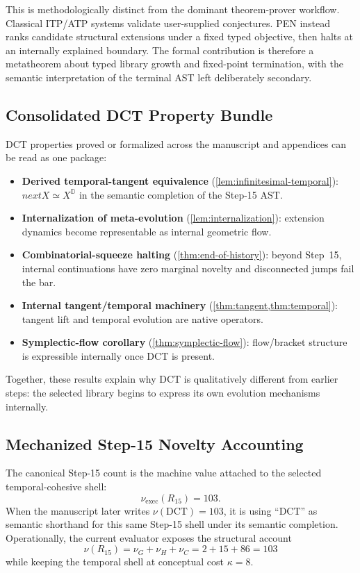 \documentclass[11pt,a4paper]{article}
\def\bigcirc{next}%
\theoremstyle{plain}
\theoremstyle{definition}
\theoremstyle{remark}
\newcommand{\D}{\mathbb{D}}
\begin{document}
This is methodologically distinct from the dominant theorem-prover workflow.
Classical ITP/ATP systems validate user-supplied conjectures.
PEN instead ranks candidate structural extensions under a fixed typed objective, then halts at an internally explained boundary.
The formal contribution is therefore a metatheorem about typed library growth and fixed-point termination, with the semantic interpretation of the terminal AST left deliberately secondary.

\subsection{Consolidated DCT Property Bundle}

DCT properties proved or formalized across the manuscript and appendices can be read as one package:
\begin{itemize}[nosep]
    \item \textbf{Derived temporal-tangent equivalence} (\cref{lem:infinitesimal-temporal}): $\bigcirc X \simeq X^\D$ in the semantic completion of the Step-15 AST.
    \item \textbf{Internalization of meta-evolution} (\cref{lem:internalization}): extension dynamics become representable as internal geometric flow.
    \item \textbf{Combinatorial-squeeze halting} (\cref{thm:end-of-history}): beyond Step~15, internal continuations have zero marginal novelty and disconnected jumps fail the bar.
    \item \textbf{Internal tangent/temporal machinery} (\cref{thm:tangent,thm:temporal}): tangent lift and temporal evolution are native operators.
    \item \textbf{Symplectic-flow corollary} (\cref{thm:symplectic-flow}): flow/bracket structure is expressible internally once DCT is present.
\end{itemize}

Together, these results explain why DCT is qualitatively different from earlier steps: the selected library begins to express its own evolution mechanisms internally.

\subsection{Mechanized Step-15 Novelty Accounting}

The canonical Step-15 count is the machine value attached to the selected temporal-cohesive shell:
\[
  \nu_{\mathrm{exec}}(R_{15}) = 103.
\]
When the manuscript later writes $\nu(\mathrm{DCT}) = 103$, it is using ``DCT'' as semantic shorthand for this same Step-15 shell under its semantic completion.
Operationally, the current evaluator exposes the structural account
\[
  \nu(R_{15}) = \nu_G + \nu_H + \nu_C = 2 + 15 + 86 = 103
\]
while keeping the temporal shell at conceptual cost $\kappa = 8$.
\end{document}

